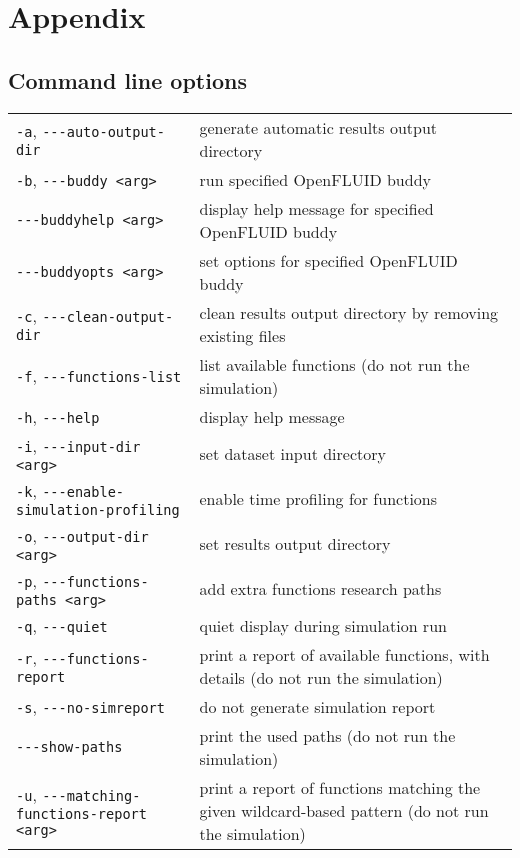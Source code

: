 \chapter{Appendix}



\section{Command line options}

\begin{center}
\begin{tabularx}{\linewidth}{lX}
\texttt{-a}, \verb?---?\texttt{auto-output-dir}&generate automatic results output directory\\
\texttt{-b}, \verb?---?\texttt{buddy <arg>}&run specified OpenFLUID buddy\\
\verb?---?\texttt{buddyhelp <arg>}&display help message for specified OpenFLUID buddy\\
\verb?---?\texttt{buddyopts <arg>}&set options for specified OpenFLUID buddy\\
\texttt{-c}, \verb?---?\texttt{clean-output-dir}&clean results output directory by removing existing files\\
\texttt{-f}, \verb?---?\texttt{functions-list}&list available functions (do not run the simulation)\\
\texttt{-h}, \verb?---?\texttt{help}&display help message\\
\texttt{-i}, \verb?---?\texttt{input-dir <arg>}&set dataset input directory\\
\texttt{-k}, \verb?---?\texttt{enable-simulation-profiling}&enable time profiling for functions\\
\texttt{-o}, \verb?---?\texttt{output-dir <arg>}&set results output directory\\
\texttt{-p}, \verb?---?\texttt{functions-paths <arg>}&add extra functions research paths\\
\texttt{-q}, \verb?---?\texttt{quiet}&quiet display during simulation run\\
\texttt{-r}, \verb?---?\texttt{functions-report}&print a report of available functions, with details (do not run the simulation)\\
\texttt{-s}, \verb?---?\texttt{no-simreport}&do not generate simulation report\\
\verb?---?\texttt{show-paths}&print the used paths (do not run the simulation)\\
\texttt{-u}, \verb?---?\texttt{matching-functions-report <arg>}&print a report of functions matching the given wildcard-based pattern (do not run the simulation)\\

\end{tabularx}
\end{center}
